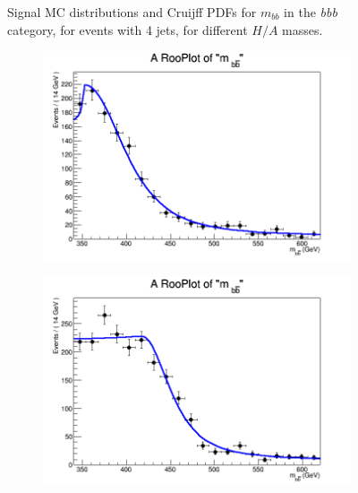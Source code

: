 \begin{figure}[phtb!]
\begin{center}
  \caption{Signal MC distributions and Cruijff PDFs for $m_{bb}$ in the {\it bbb} category, for events with 4 jets, for different $H/A$ masses. \label{fig:signalPDFs_4j}}
    \end{center}
\end{figure}

\begin{figure}[phtb!]
  \begin{center}
  \begin{subfigure}[$m_{A}=400$ GeV]{0.4\textwidth}\includegraphics[width=\textwidth]{FitResults/images/fitMC_bAbb400_3.png}\end{subfigure}
  \begin{subfigure}[$m_{A}=450$ GeV]{0.4\textwidth}\includegraphics[width=\textwidth]{FitResults/images/fitMC_bAbb450_3.png}\end{subfigure}

\end{center}
\end{figure}
